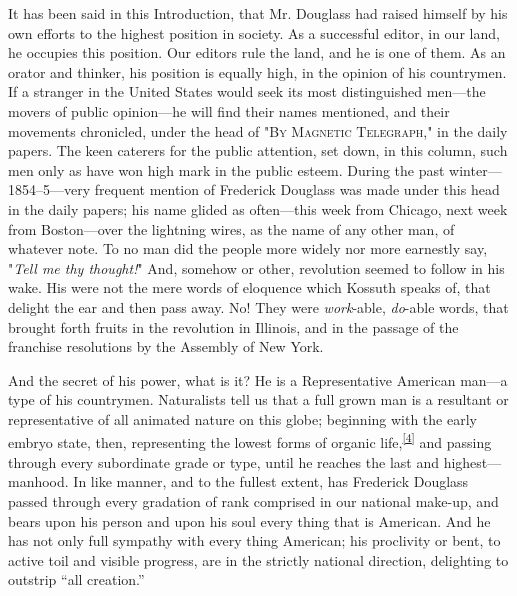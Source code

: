 It has been said in this Introduction, that Mr. Douglass had raised
himself by his own efforts to the highest position in society. As a
successful editor, in our land, he occupies this position. Our editors
rule the land, and he is one of them. As an orator and thinker, his
position is equally high, in the opinion of his countrymen. If a
stranger in the United States would seek its most distinguished
men---the movers of public opinion---he will find their names mentioned,
and their movements chronicled, under the head of "\textsc{By Magnetic
Telegraph}," in the daily papers. The keen caterers for the public
attention, set down, in this column, such men only as have won high mark
in the public esteem. During the past winter---1854--5---very frequent
mention of Frederick Douglass was made under this head in the daily
papers; his name glided as often---this week from Chicago, next week
from Boston---over the lightning wires, as the name of any other man, of
whatever note. To no man did the people more widely nor more earnestly
say, "\emph{Tell me thy thought!}" And, somehow or other, revolution
seemed to follow in his wake. His were not the mere words of eloquence
which Kossuth speaks of, that delight the ear and then pass away. No!
They were \emph{work}-able, \emph{do}-able words, that brought forth
fruits in the revolution in Illinois, and in the passage of the
franchise resolutions by the Assembly of New York.

And the secret of his power, what is it? He is a Representative American
man---a type of his countrymen. Naturalists tell us that a full grown
man is a resultant or representative of all animated nature on this
globe; beginning with the early embryo state, then,
{\protect\hypertarget{xxvi}{}{}}representing the lowest forms of organic
life,\textsuperscript{\protect\hyperlink{cite_note-4}{{[}4{]}}} and
passing through every subordinate grade or type, until he reaches the
last and highest---manhood. In like manner, and to the fullest extent,
has Frederick Douglass passed through every gradation of rank comprised
in our national make-up, and bears upon his person and upon his soul
every thing that is American. And he has not only full sympathy with
every thing American; his proclivity or bent, to active toil and visible
progress, are in the strictly national direction, delighting to outstrip
``all creation.''

